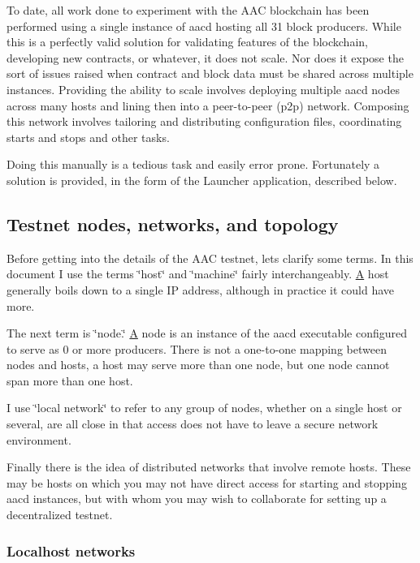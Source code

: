 To date, all work done to experiment with the A\+AC blockchain has been performed using a single instance of aacd hosting all 31 block producers. While this is a perfectly valid solution for validating features of the blockchain, developing new contracts, or whatever, it does not scale. Nor does it expose the sort of issues raised when contract and block data must be shared across multiple instances. Providing the ability to scale involves deploying multiple aacd nodes across many hosts and lining then into a peer-\/to-\/peer (p2p) network. Composing this network involves tailoring and distributing configuration files, coordinating starts and stops and other tasks.

Doing this manually is a tedious task and easily error prone. Fortunately a solution is provided, in the form of the Launcher application, described below.

\subsection*{Testnet nodes, networks, and topology}

Before getting into the details of the A\+AC testnet, lets clarify some terms. In this document I use the terms \char`\"{}host\char`\"{} and \char`\"{}machine\char`\"{} fairly interchangeably. \mbox{\hyperlink{struct_a}{A}} host generally boils down to a single IP address, although in practice it could have more.

The next term is \char`\"{}node.\char`\"{} \mbox{\hyperlink{struct_a}{A}} node is an instance of the aacd executable configured to serve as 0 or more producers. There is not a one-\/to-\/one mapping between nodes and hosts, a host may serve more than one node, but one node cannot span more than one host.

I use \char`\"{}local network\char`\"{} to refer to any group of nodes, whether on a single host or several, are all close in that access does not have to leave a secure network environment.

Finally there is the idea of distributed networks that involve remote hosts. These may be hosts on which you may not have direct access for starting and stopping aacd instances, but with whom you may wish to collaborate for setting up a decentralized testnet.

\subsubsection*{Localhost networks}

